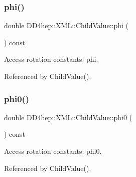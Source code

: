 \hypertarget{struct_d_d4hep_1_1_x_m_l_1_1_child_value_af9e40776fdff0dcd03f5b07421718049}{}\label{struct_d_d4hep_1_1_x_m_l_1_1_child_value_af9e40776fdff0dcd03f5b07421718049} 
\subsubsection{\texorpdfstring{phi()}{phi()}}
{\footnotesize\ttfamily double D\+D4hep\+::\+X\+M\+L\+::\+Child\+Value\+::phi (\begin{DoxyParamCaption}{ }\end{DoxyParamCaption}) const}



Access rotation constants\+: phi. 



Referenced by Child\+Value().

\hypertarget{struct_d_d4hep_1_1_x_m_l_1_1_child_value_a412c6734bace421d9d583a5cc6d09a63}{}\label{struct_d_d4hep_1_1_x_m_l_1_1_child_value_a412c6734bace421d9d583a5cc6d09a63} 
\subsubsection{\texorpdfstring{phi0()}{phi0()}\hspace{0.1cm}{\footnotesize\ttfamily [1/2]}}
{\footnotesize\ttfamily double D\+D4hep\+::\+X\+M\+L\+::\+Child\+Value\+::phi0 (\begin{DoxyParamCaption}{ }\end{DoxyParamCaption}) const}



Access rotation constants\+: phi0. 



Referenced by Child\+Value().

\hypertarget{struct_d_d4hep_1_1_x_m_l_1_1_child_value_ad0b3578457e79bdf4216aa47d62c97c9}{}\label{struct_d_d4hep_1_1_x_m_l_1_1_child_value_ad0b3578457e79bdf4216aa47d62c97c9} 
